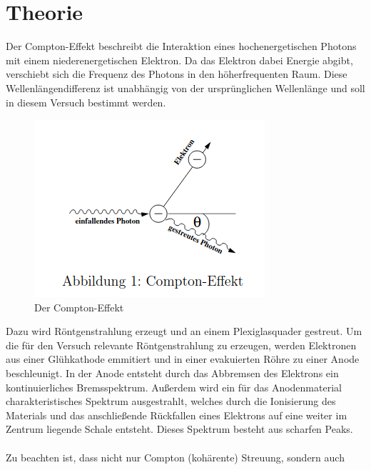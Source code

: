 \section{Theorie}
\label{sec:Theorie}
    Der Compton-Effekt beschreibt die Interaktion eines hochenergetischen Photons mit einem 
    niederenergetischen Elektron. Da das Elektron dabei Energie abgibt, verschiebt sich 
    die Frequenz des Photons in den höherfrequenten Raum. Diese Wellenlängendifferenz
    ist unabhängig von der ursprünglichen Wellenlänge und soll in diesem Versuch bestimmt 
    werden.\\
    \begin{figure}
        \centering
        \includegraphics[width=\textwidth]{compton.png}
        \caption{Der Compton-Effekt}
        \label{fig:compost}
    \end{figure}
    Dazu wird Röntgenstrahlung erzeugt und an einem Plexiglasquader gestreut. Um die für 
    den Versuch relevante Röntgenstrahlung zu erzeugen, werden Elektronen aus einer 
    Glühkathode emmitiert und in einer evakuierten Röhre zu einer Anode beschleunigt. In der Anode
    entsteht durch das Abbremsen des Elektrons ein kontinuierliches Bremsspektrum. Außerdem 
    wird ein für das Anodenmaterial charakteristisches Spektrum ausgestrahlt, welches durch die 
    Ionisierung des Materials und das anschließende Rückfallen eines Elektrons auf eine weiter im 
    Zentrum liegende Schale entsteht. Dieses Spektrum besteht aus scharfen Peaks. \\
    \\
    Zu beachten ist, dass nicht nur Compton (kohärente) Streuung, sondern auch
